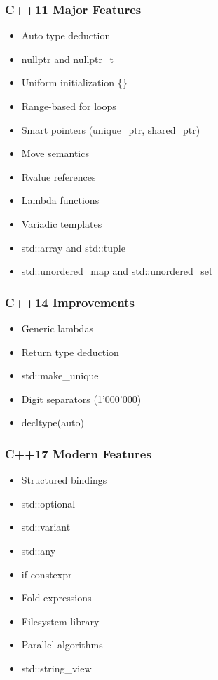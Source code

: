 \hypertarget{c11-major-features}{%
\subsubsection{C++11 Major Features}\label{c11-major-features}}

\begin{itemize}
\tightlist
\item
  Auto type deduction
\item
  nullptr and nullptr\_t
\item
  Uniform initialization \{\}
\item
  Range-based for loops
\item
  Smart pointers (unique\_ptr, shared\_ptr)
\item
  Move semantics
\item
  Rvalue references
\item
  Lambda functions
\item
  Variadic templates
\item
  std::array and std::tuple
\item
  std::unordered\_map and std::unordered\_set
\end{itemize}

\hypertarget{c14-improvements}{%
\subsubsection{C++14 Improvements}\label{c14-improvements}}

\begin{itemize}
\tightlist
\item
  Generic lambdas
\item
  Return type deduction
\item
  std::make\_unique
\item
  Digit separators (1'000'000)
\item
  decltype(auto)
\end{itemize}

\hypertarget{c17-modern-features}{%
\subsubsection{C++17 Modern Features}\label{c17-modern-features}}

\begin{itemize}
\tightlist
\item
  Structured bindings
\item
  std::optional
\item
  std::variant
\item
  std::any
\item
  if constexpr
\item
  Fold expressions
\item
  Filesystem library
\item
  Parallel algorithms
\item
  std::string\_view
\end{itemize}


